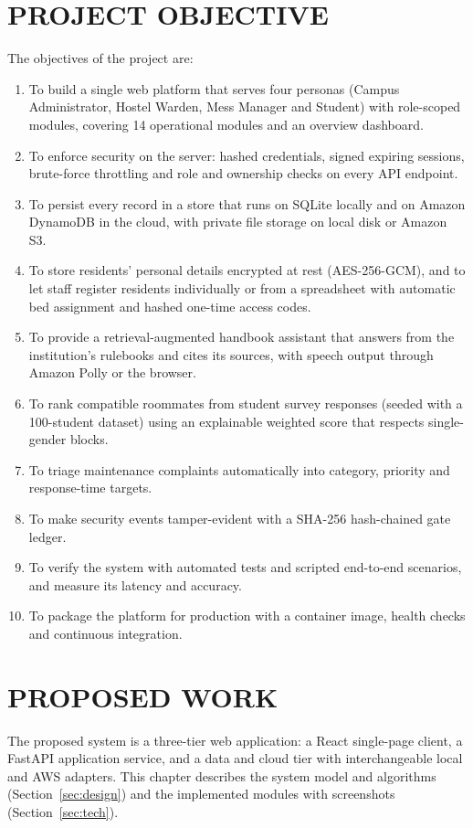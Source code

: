 \documentclass[12pt,a4paper,oneside]{report}
\begin{document}
\chapter{PROJECT OBJECTIVE}
The objectives of the project are:
\begin{enumerate}
  \item To build a single web platform that serves four personas (Campus Administrator, Hostel Warden, Mess Manager and
  Student) with role-scoped modules, covering 14 operational modules and an overview dashboard.
  \item To enforce security on the server: hashed credentials, signed expiring sessions, brute-force throttling and
  role and ownership checks on every API endpoint.
  \item To persist every record in a store that runs on SQLite locally and on Amazon DynamoDB in the cloud, with private
  file storage on local disk or Amazon S3.
  \item To store residents' personal details encrypted at rest (AES-256-GCM), and to let staff register residents
  individually or from a spreadsheet with automatic bed assignment and hashed one-time access codes.
  \item To provide a retrieval-augmented handbook assistant that answers from the institution's rulebooks and cites its
  sources, with speech output through Amazon Polly or the browser.
  \item To rank compatible roommates from student survey responses (seeded with a 100-student dataset) using an
  explainable weighted score that respects single-gender blocks.
  \item To triage maintenance complaints automatically into category, priority and response-time targets.
  \item To make security events tamper-evident with a SHA-256 hash-chained gate ledger.
  \item To verify the system with automated tests and scripted end-to-end scenarios, and measure its latency and
  accuracy.
  \item To package the platform for production with a container image, health checks and continuous integration.
\end{enumerate}

\chapter{PROPOSED WORK}
The proposed system is a three-tier web application: a React single-page client, a FastAPI application service, and a
data and cloud tier with interchangeable local and AWS adapters. This chapter describes the system model and algorithms
(Section~\ref{sec:design}) and the implemented modules with screenshots (Section~\ref{sec:tech}).
\end{document}
